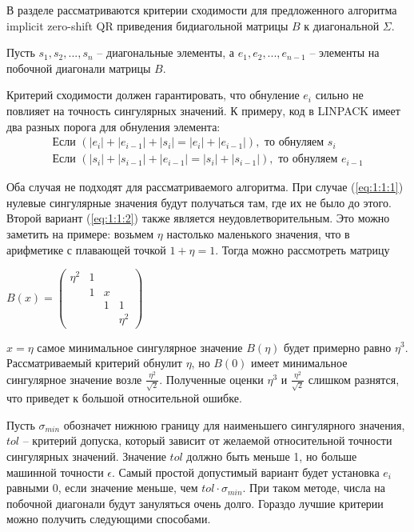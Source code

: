 В разделе рассматриваются критерии сходимости для предложенного алгоритма implicit zero-shift QR приведения бидиагольной матрицы $B$ к диагональной $\Sigma$.

Пусть $s_1, s_2,...,s_n$ \--- диагональные элементы, а $e_1, e_2, ..., e_{n-1}$ \--- элементы на побочной диагонали матрицы $B$. 


Критерий сходимости должен гарантировать, что обнуление $e_i$ сильно не повлияет на точность сингулярных значений. К примеру, код в LINPACK имеет два разных порога для обнуления элемента:
\begin{align}
\text{Если } (|e_i| + |e_{i-1}| + |s_i| = |e_i| + |e_{i-1}|), \text{ то обнуляем }s_i \label{eq:1:1:1}
\\\text{Если } (|s_i| + |s_{i-1}| + |e_{i-1}| = |s_i| + |s_{i-1}|), \text{ то обнуляем }e_{i-1} \label{eq:1:1:2}
\end{align}

Оба случая не подходят для рассматриваемого алгоритма. При случае (\ref{eq:1:1:1}) нулевые сингулярные значения будут получаться там, где их не было до этого. Второй вариант (\ref{eq:1:1:2})  также является неудовлетворительным. Это можно заметить на примере: возьмем $\eta$ настолько маленького значения, что в арифметике с плавающей точкой $1+\eta=1$. Тогда можно рассмотреть матрицу
\begin{center}
$B(x)=\begin{pmatrix}
    \eta^2&1&&\\
    &1&x\\
    &&1&1\\
    &&&\eta^2
\end{pmatrix}$
\end{center}

 $x=\eta$ самое минимальное сингулярное значение $B(\eta)$ будет примерно равно $\eta^3$. Рассматриваемый критерий обнулит $\eta$, но $B(0)$ имеет минимальное сингулярное значение возле $\frac{\eta^2}{\sqrt{2}}$. Полученные оценки $\eta^3$ и $\frac{\eta^2}{\sqrt{2}}$ слишком разнятся, что приведет к большой относительной ошибке.

Пусть $\sigma_{min}$ обозначет нижнюю границу для наименьшего сингулярного значения, $tol$ \--- критерий допуска, который зависит от желаемой относительной точности сингулярных значений. Значение $tol$ должно быть меньше 1, но больше машинной точности $\epsilon$. Самый простой допустимый вариант будет установка $e_i$ равными 0, если значение меньше, чем $tol\cdot\sigma_{min}$. При таком методе, числа на побочной диагонали будут зануляться очень долго. Гораздо лучшие критерии можно получить следующими способами.

